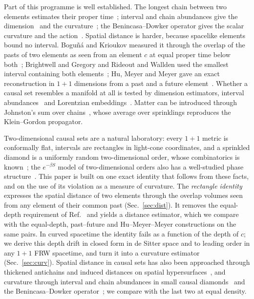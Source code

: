 \documentclass[prd,twocolumn,superscriptaddress,nofootinbib,amsmath,amssymb,floatfix]{revtex4-2}
\begin{document}
Part of this programme is well established. The longest chain between two elements estimates their proper time~\cite{BrightwellGregory91}; interval and chain abundances give the dimension~\cite{Myrheim78,Meyer88} and the curvature~\cite{RSS13,GlaserSurya13}; the Benincasa--Dowker operator gives the scalar curvature and the action~\cite{BD10,DowkerGlaser13}. Spatial distance is harder, because spacelike elements bound no interval. Bogu\~n\'a and Krioukov measured it through the overlap of the pasts of two elements as seen from an element $c$ at equal proper time below both~\cite{BK24}; Brightwell and Gregory and Rideout and Wallden used the smallest interval containing both elements~\cite{BrightwellGregory91,RideoutWallden09}; Hu, Meyer and Meyer gave an exact reconstruction in $1+1$ dimensions from a past and a future element~\cite{HMM25}. Whether a causal set resembles a manifold at all is tested by dimension estimators, interval abundances~\cite{GlaserSurya13} and Lorentzian embeddings~\cite{CloughEvans16,Henson06,Johnston25}. Matter can be introduced through Johnston's sum over chains~\cite{Johnston08,Johnston09}, whose average over sprinklings reproduces the Klein--Gordon propagator.

Two-dimensional causal sets are a natural laboratory: every $1+1$ metric is conformally flat, intervals are rectangles in light-cone coordinates, and a sprinkled diamond is a uniformly random two-dimensional order, whose combinatorics is known~\cite{BHS08,Surya12}; the $e^{-\beta S}$ model of two-dimensional orders also has a well-studied phase structure~\cite{BHS08,Surya12,GOS18}. This paper is built on one exact identity that follows from these facts, and on the use of its violation as a measure of curvature. The \emph{rectangle identity} expresses the spatial distance of two elements through the overlap volumes seen from any element of their common past (Sec.~\ref{sec:dist}). It removes the equal-depth requirement of Ref.~\cite{BK24} and yields a distance estimator, which we compare with the equal-depth, past--future and Hu--Meyer--Meyer constructions on the same pairs. In curved spacetime the identity fails as a function of the depth of $c$; we derive this depth drift in closed form in de Sitter space and to leading order in any $1+1$ FRW spacetime, and turn it into a curvature estimator (Sec.~\ref{sec:curv}). Spatial distance in causal sets has also been approached through thickened antichains and induced distances on spatial hypersurfaces~\cite{MRS06,MRS07,ESV19}, and curvature through interval and chain abundances in small causal diamonds~\cite{RSS13,KhetrapalSurya13} and the Benincasa--Dowker operator~\cite{BD10}; we compare with the last two at equal density.
\end{document}

